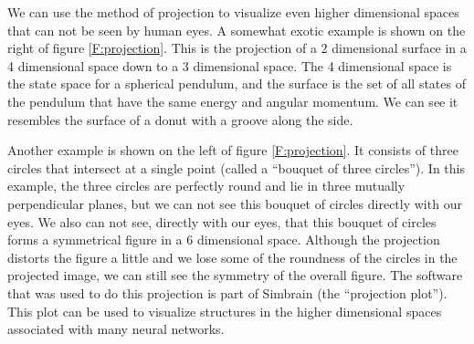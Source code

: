 
   We can use the method of projection to visualize even higher dimensional 
spaces that can not be seen by human eyes. A somewhat exotic example is shown 
on the right of figure \ref{F:projection}. This is the projection of a 2 
dimensional surface in a 4 dimensional space down to a 3 dimensional space. 
The 4 dimensional space is the state space for a spherical pendulum, and the 
surface is the set of all states of the pendulum that have the same energy and 
angular momentum. We can see it resembles the surface of a donut with a groove
along the side. 

   Another example is shown on the left of figure \ref{F:projection}. It 
consists of three circles that intersect at a single point (called a ``bouquet 
of three circles''). In this example, the three circles are perfectly round and 
lie in three mutually perpendicular planes, but we can not see this bouquet of 
circles directly with our eyes. We also can not see, directly with our eyes, 
that this bouquet of circles forms a symmetrical figure in a 6 dimensional 
space. Although the projection distorts the figure a little and we lose some 
of the roundness of the circles in the projected image, we can still see the 
symmetry of the overall figure. The software that was used to do this 
projection is part of Simbrain (the ``projection plot''). This plot can be 
used to visualize structures in the higher dimensional spaces associated with 
many neural networks.

